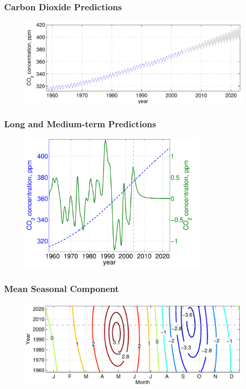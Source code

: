 \documentclass[10pt]{beamer}
\begin{document}
  \begin{frame}
    \frametitle{Carbon Dioxide Predictions}

    \begin{figure}
      \centering
      \includegraphics[width=\textwidth]{prediction2.png}
    \end{figure}
  \end{frame}

  \begin{frame}
    \frametitle{Long and Medium-term Predictions}

    \begin{figure}
      \centering
      \includegraphics[width=0.8\textwidth]{prediction3.png}
    \end{figure}
  \end{frame}

  \begin{frame}
    \frametitle{Mean Seasonal Component}

    \begin{figure}
      \centering
      \includegraphics[width=\textwidth]{prediction4.png}
    \end{figure}
  \end{frame}
\end{document}

